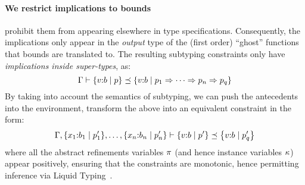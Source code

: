 \paragraph{We restrict implications to bounds} \ie prohibit
them from appearing elsewhere in type specifications.
%
Consequently, the implications only appear in the
\emph{output} type of the (first order) ``ghost''
functions that bounds are translated to.
%
The resulting subtyping constraints only have
\emph{implications inside super-types}, \ie as:
$$
\Gamma \vdash \left\lbrace v\text{:}b\mid p\right\rbrace \preceq \left\lbrace v\text{:}b\mid p_1 \Rightarrow \dots \Rightarrow p_{n} \Rightarrow p_q\right\rbrace
$$
%
By taking into account the semantics of subtyping, we can
push the antecedents into the environment, \ie transform
the above into an equivalent constraint in the form:
$$
\isSubType{
\EXTT{
 \EXTT{\Gamma}{x_1}{\sxref{b_1}{\areft_1'}{x_1}},\dots
}{x_n}{\sxref{b_n}{\areft_n'}{x_n}}
}
{\stref{b}{\areft'}}
{\stref{b}{\areft_q'}}
$$
where all the abstract refinements variables $\pi$
(and hence instance variables $\kappa$) appear positively,
ensuring that the constraints are monotonic, hence permitting
inference via Liquid Typing~\citep{LiquidPLDI08}.


